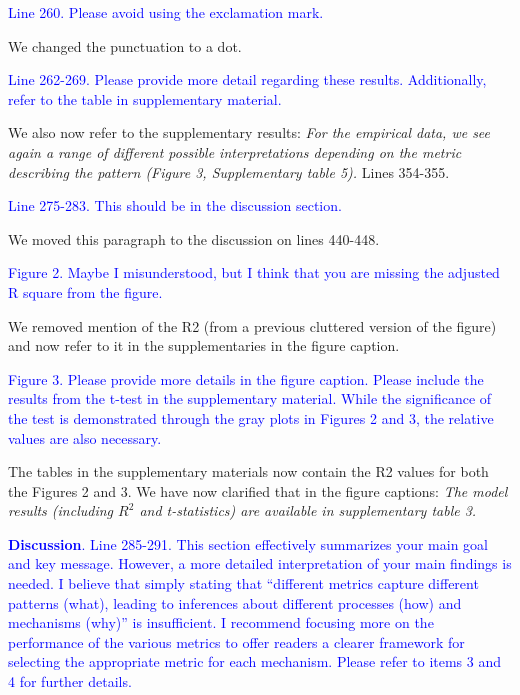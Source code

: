 \documentclass[
]{article}
\begin{document}
\textcolor{blue}{Line 260. Please avoid using the exclamation mark.}

We changed the punctuation to a dot.

\textcolor{blue}{Line 262-269. Please provide more detail regarding these results. Additionally, refer to the table in supplementary material.}


We also now refer to the supplementary results:
\textit{For the empirical data, we see again a range of different possible interpretations depending on the metric describing the pattern (Figure 3, Supplementary table 5).}
Lines 354-355.

\textcolor{blue}{Line 275-283. This should be in the discussion section.}

We moved this paragraph to the discussion on lines 440-448.

\textcolor{blue}{Figure 2. Maybe I misunderstood, but I think that you are missing the adjusted R square from the figure.}

We removed mention of the R2 (from a previous cluttered version of the figure) and now refer to it in the supplementaries in the figure caption.

\textcolor{blue}{Figure 3. Please provide more details in the figure caption. Please include the results from the t-test in the supplementary material.
While the significance of the test is demonstrated through the gray plots in Figures 2 and 3, the relative values are also necessary.}

The tables in the supplementary materials now contain the R2 values for both the Figures 2 and 3.
We have now clarified that in the figure captions:
\textit{The model results (including $R^{2}$ and t-statistics) are available in supplementary table 3.}

\textcolor{blue}{\textbf{Discussion}.}
\textcolor{blue}{Line 285-291. This section effectively summarizes your main goal and key message.
However, a more detailed interpretation of your main findings is needed.
I believe that simply stating that ``different metrics capture different patterns (what), leading to inferences about different processes (how) and mechanisms (why)'' is insufficient.
I recommend focusing more on the performance of the various metrics to offer readers a clearer framework for selecting the appropriate metric for each mechanism.
Please refer to items 3 and 4 for further details.}
\end{document}
